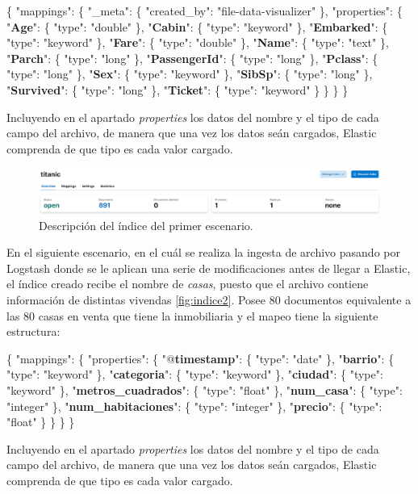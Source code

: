 \{ "mappings": \{ "\_meta": \{ "created\_by": "file-data-visualizer" \}, 
"properties": \{ "\textbf{Age}": \{ "type": "double" \}, "\textbf{Cabin}": \{ "type": "keyword" \}, "\textbf{Embarked}": \{ "type": "keyword" \}, "\textbf{Fare}": \{ "type": "double" \}, "\textbf{Name}": \{ "type": "text" \}, "\textbf{Parch}": \{ "type": "long" \}, "\textbf{PassengerId}": \{ "type": "long" \}, "\textbf{Pclass}": \{ "type": "long" \}, "\textbf{Sex}": \{ "type": "keyword" \}, "\textbf{SibSp}": \{ "type": "long" \}, "\textbf{Survived}": \{ "type": "long" \}, "\textbf{Ticket}": \{ "type": "keyword" \} \} \} \} 

Incluyendo en el apartado \textit{properties} los datos del nombre y el tipo de cada campo del archivo, de manera que una vez los datos seán cargados, Elastic comprenda de que tipo es cada valor cargado.

\begin{figure}
    \centering
    \includegraphics[width=1\linewidth]{img/titanic1.png}
    \caption{Descripción del índice del primer escenario.}
    \label{fig:indice1}
\end{figure}

En el siguiente escenario, en el cuál se realiza la ingesta de archivo pasando por Logstash donde se le aplican una serie de modificaciones antes de llegar a Elastic, el índice creado recibe el nombre de \textit{casas}, puesto que el archivo contiene información de distintas vivendas \ref{fig:indice2}. Posee 80 documentos equivalente a las 80 casas en venta que tiene la inmobiliaria y el mapeo tiene la siguiente estructura:

\{ "mappings": \{ "properties": \{ "@\textbf{timestamp}": \{ "type": "date" \}, "\textbf{barrio}": \{ "type": "keyword" \}, "\textbf{categoria}": \{ "type": "keyword" \}, "\textbf{ciudad}": \{ "type": "keyword" \}, "\textbf{metros\_cuadrados}": \{ "type": "float" \}, "\textbf{num\_casa}": \{ "type": "integer" \}, "\textbf{num\_habitaciones}": \{ "type": "integer" \}, "\textbf{precio}": \{ "type": "float" \} \} \} \}

Incluyendo en el apartado \textit{properties} los datos del nombre y el tipo de cada campo del archivo, de manera que una vez los datos seán cargados, Elastic comprenda de que tipo es cada valor cargado.

